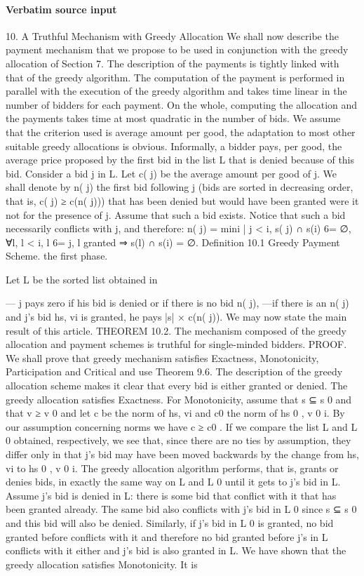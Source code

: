 \documentclass[10pt]{article}
\begin{document}
\paragraph{Verbatim source input}
\begin{ReviewVerbatim}
10. A Truthful Mechanism with Greedy Allocation
We shall now describe the payment mechanism that we propose to be used in
conjunction with the greedy allocation of Section 7. The description of the payments
is tightly linked with that of the greedy algorithm. The computation of the payment
is performed in parallel with the execution of the greedy algorithm and takes time
linear in the number of bidders for each payment. On the whole, computing the
allocation and the payments takes time at most quadratic in the number of bids.
We assume that the criterion used is average amount per good, the adaptation
to most other suitable greedy allocations is obvious. Informally, a bidder pays, per
good, the average price proposed by the first bid in the list L that is denied because
of this bid. Consider a bid j in L. Let c( j) be the average amount per good of j. We
shall denote by n( j) the first bid following j (bids are sorted in decreasing order,
that is, c( j) ≥ c(n( j))) that has been denied but would have been granted were it
not for the presence of j. Assume that such a bid exists. Notice that such a bid
necessarily conflicts with j, and therefore:
n( j) = min{i | j < i, s( j) ∩ s(i) 6= ∅, ∀l, l < i, l 6= j, l granted ⇒ s(l) ∩ s(i) = ∅}.
Definition 10.1 Greedy Payment Scheme.
the first phase.

Let L be the sorted list obtained in

— j pays zero if his bid is denied or if there is no bid n( j),
—if there is an n( j) and j’s bid hs, vi is granted, he pays |s| × c(n( j)).
We may now state the main result of this article.
THEOREM 10.2. The mechanism composed of the greedy allocation and payment schemes is truthful for single-minded bidders.
PROOF. We shall prove that greedy mechanism satisfies Exactness, Monotonicity, Participation and Critical and use Theorem 9.6. The description of the greedy
allocation scheme makes it clear that every bid is either granted or denied. The
greedy allocation satisfies Exactness. For Monotonicity, assume that s ⊆ s 0 and
that v ≥ v 0 and let c be the norm of hs, vi and c0 the norm of hs 0 , v 0 i. By our
assumption concerning norms we have c ≥ c0 . If we compare the list L and L 0 obtained, respectively, we see that, since there are no ties by assumption, they differ
only in that j’s bid may have been moved backwards by the change from hs, vi to
hs 0 , v 0 i. The greedy allocation algorithm performs, that is, grants or denies bids, in
exactly the same way on L and L 0 until it gets to j’s bid in L. Assume j’s bid is
denied in L: there is some bid that conflict with it that has been granted already.
The same bid also conflicts with j’s bid in L 0 since s ⊆ s 0 and this bid will also be
denied. Similarly, if j’s bid in L 0 is granted, no bid granted before conflicts with it
and therefore no bid granted before j’s in L conflicts with it either and j’s bid is also
granted in L. We have shown that the greedy allocation satisfies Monotonicity. It is



\end{ReviewVerbatim}
\end{document}
